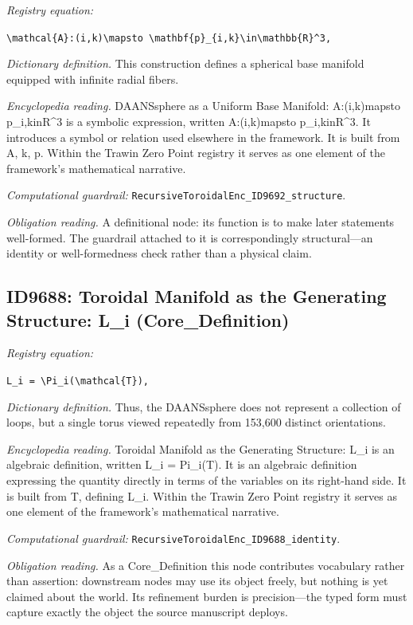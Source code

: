 \documentclass[11pt]{article}
\theoremstyle{remark}
\begin{document}
\noindent\textit{Registry equation:}\par
{\small\texttt{\textbackslash{}mathcal\{A\}:(i,k)\textbackslash{}mapsto \textbackslash{}mathbf\{p\}\_\{i,k\}\textbackslash{}in\textbackslash{}mathbb\{R\}\textasciicircum{}3,}}\par\medskip
\noindent\textit{Dictionary definition.} This construction defines a spherical base manifold equipped with infinite radial fibers.\par\medskip
\noindent\textit{Encyclopedia reading.} DAANSsphere as a Uniform Base Manifold: A:(i,k)mapsto p\_i,kinR\textasciicircum{}3 is a symbolic expression, written A:(i,k)mapsto p\_i,kinR\textasciicircum{}3. It introduces a symbol or relation used elsewhere in the framework. It is built from A, k, p. Within the Trawin Zero Point registry it serves as one element of the framework's mathematical narrative.
\par\medskip\noindent\textit{Computational guardrail:} \texttt{RecursiveToroidalEnc\_ID9692\_structure}.
\par\medskip\noindent\textit{Obligation reading.} A definitional node: its function is to make later statements well-formed. The guardrail attached to it is correspondingly structural---an identity or well-formedness check rather than a physical claim.

\subsection{ID9688: Toroidal Manifold as the Generating Structure: L\_i (Core\_Definition)}

\noindent\textit{Registry equation:}\par
{\small\texttt{L\_i = \textbackslash{}Pi\_i(\textbackslash{}mathcal\{T\}),}}\par\medskip
\noindent\textit{Dictionary definition.} Thus, the DAANSsphere does not represent a collection of loops, but a single torus viewed repeatedly from 153,600 distinct orientations.\par\medskip
\noindent\textit{Encyclopedia reading.} Toroidal Manifold as the Generating Structure: L\_i is an algebraic definition, written L\_i = Pi\_i(T). It is an algebraic definition expressing the quantity directly in terms of the variables on its right-hand side. It is built from T, defining L\_i. Within the Trawin Zero Point registry it serves as one element of the framework's mathematical narrative.
\par\medskip\noindent\textit{Computational guardrail:} \texttt{RecursiveToroidalEnc\_ID9688\_identity}.
\par\medskip\noindent\textit{Obligation reading.} As a Core\_Definition this node contributes vocabulary rather than assertion: downstream nodes may use its object freely, but nothing is yet claimed about the world. Its refinement burden is precision---the typed form must capture exactly the object the source manuscript deploys.
\end{document}
